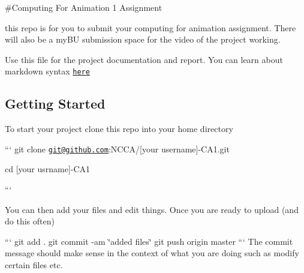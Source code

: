\#\-Computing For Animation 1 Assignment

this repo is for you to submit your computing for animation assignment. There will also be a my\-B\-U submission space for the video of the project working.

Use this file for the project documentation and report. You can learn about markdown syntax \href{https://help.github.com/articles/github-flavored-markdown/}{\tt here}

\subsection*{Getting Started}

To start your project clone this repo into your home directory

``` git clone \href{mailto:git@github.com}{\tt git@github.\-com}\-:N\-C\-C\-A/\mbox{[}your username\mbox{]}-\/\-C\-A1.\-git

cd \mbox{[}your usrname\mbox{]}-\/\-C\-A1

```

You can then add your files and edit things. Once you are ready to upload (and do this often)

``` git add . git commit -\/am \char`\"{}added files\char`\"{} git push origin master ``` The commit message should make sense in the context of what you are doing such as modify certain files etc. 
